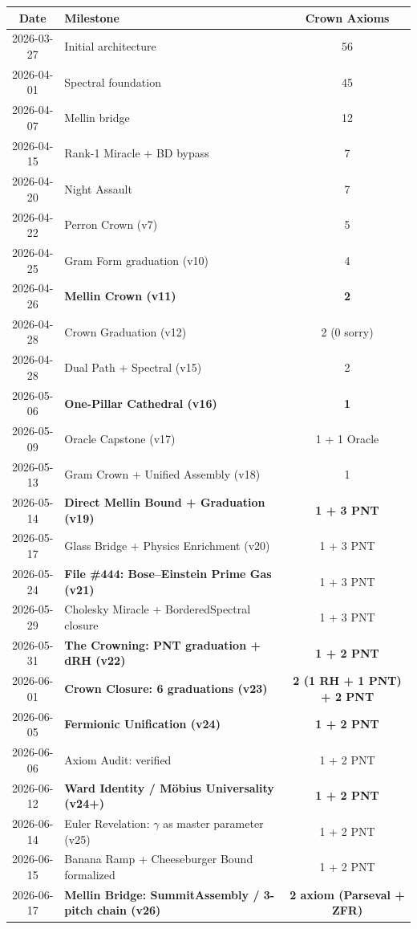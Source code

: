 \documentclass[11pt,a4paper]{article}
\begin{document}
\begin{center}
\begin{tabular}{@{}clc@{}}
\toprule
\textbf{Date} & \textbf{Milestone} & \textbf{Crown Axioms} \\
\midrule
2026-03-27 & Initial architecture & 56 \\
2026-04-01 & Spectral foundation & 45 \\
2026-04-07 & Mellin bridge & 12 \\
2026-04-15 & Rank-1 Miracle + BD bypass & 7 \\
2026-04-20 & Night Assault & 7 \\
2026-04-22 & Perron Crown (v7) & 5 \\
2026-04-25 & Gram Form graduation (v10) & 4 \\
2026-04-26 & \textbf{Mellin Crown (v11)} & \textbf{2} \\
2026-04-28 & Crown Graduation (v12) & 2 (0 sorry) \\
2026-04-28 & Dual Path + Spectral (v15) & 2 \\
2026-05-06 & \textbf{One-Pillar Cathedral (v16)} & \textbf{1} \\
2026-05-09 & Oracle Capstone (v17) & 1 + 1 Oracle \\
2026-05-13 & Gram Crown + Unified Assembly (v18) & 1 \\
2026-05-14 & \textbf{Direct Mellin Bound + Graduation (v19)} & \textbf{1 + 3 PNT} \\
2026-05-17 & Glass Bridge + Physics Enrichment (v20) & 1 + 3 PNT \\
2026-05-24 & \textbf{File \#444: Bose--Einstein Prime Gas (v21)} & 1 + 3 PNT \\
2026-05-29 & Cholesky Miracle + BorderedSpectral closure & 1 + 3 PNT \\
2026-05-31 & \textbf{The Crowning: PNT graduation + dRH (v22)} & \textbf{1 + 2 PNT} \\
2026-06-01 & \textbf{Crown Closure: 6 graduations (v23)} & \textbf{2 (1 RH + 1 PNT) + 2 PNT} \\
2026-06-05 & \textbf{Fermionic Unification (v24)} & \textbf{1 + 2 PNT} \\
2026-06-06 & Axiom Audit: verified & 1 + 2 PNT \\
2026-06-12 & \textbf{Ward Identity / M\"obius Universality (v24+)} & \textbf{1 + 2 PNT} \\
2026-06-14 & Euler Revelation: $\gamma$ as master parameter (v25) & 1 + 2 PNT \\
2026-06-15 & Banana Ramp + Cheeseburger Bound formalized & 1 + 2 PNT \\
2026-06-17 & \textbf{Mellin Bridge: SummitAssembly / 3-pitch chain (v26)} & \textbf{2 axiom (Parseval + ZFR)} \\
\bottomrule
\end{tabular}
\end{center}
\end{document}
